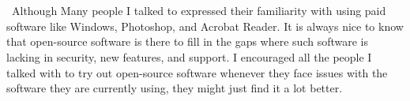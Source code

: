 \documentclass{article}
\begin{document}
\\\\\
Although Many people I talked to expressed their familiarity with using paid software like Windows, Photoshop, and Acrobat Reader. It is always nice to know that open-source software is there to fill in the gaps where such software is lacking in security, new features, and support. I encouraged all the people I talked with to try out open-source software whenever they face issues with the software they are currently using, they might just find it a lot better.
\end{document}
